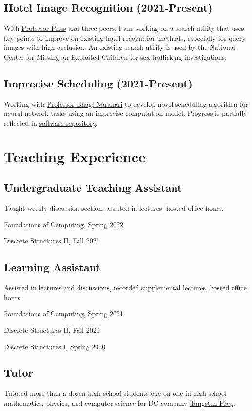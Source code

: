 \documentclass[letterpaper]{article}
\renewenvironment{itemize}{
  \begin{list}{}{
    \setlength{\leftmargin}{1.5em}
  }
}{
  \end{list}
}
\begin{document}
\subsection*{Hotel Image Recognition (2021-Present)}
With \href{https://www2.seas.gwu.edu/~pless/}{Professor Pless} and three peers, I am working
on a search utility that uses key points to improve on existing hotel recognition methods,
especially for query images with high occlusion.
An existing search utility is used by the National Center for Missing an Exploited Children
for sex trafficking investigations.

\subsection*{Imprecise Scheduling (2021-Present)}
Working with \href{https://www2.seas.gwu.edu/~narahari/}{Professor Bhagi Narahari} to 
develop novel scheduling algorithm for neural network tasks using an imprecise computation
model. Progress is partially reflected in 
\href{https://github.com/obroadrick/imprecise}{software repository}.

\section*{Teaching Experience}
\subsection*{Undergraduate Teaching Assistant}
Taught weekly discussion section, assisted in lectures, hosted office hours.
\begin{itemize}
\item
Foundations of Computing, Spring 2022
\item
Discrete Structures II, Fall 2021
\end{itemize}
\subsection*{Learning Assistant}
Assisted in lectures and discussions, recorded supplemental lectures, hosted office hours.
\begin{itemize}
\item
Foundations of Computing, Spring 2021
\item
Discrete Structures II, Fall 2020
\item
Discrete Structures I, Spring 2020
\end{itemize}
\subsection*{Tutor}
Tutored more than a dozen high school students one-on-one in high school mathematics, physics, and computer science for DC company \href{https://www.tungstenprep.com/}{Tungsten Prep}.
\end{document}

